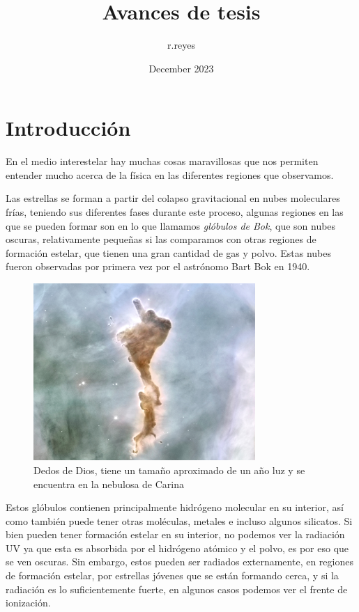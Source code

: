 \documentclass{book}
\title{Avances de tesis}
\author{r.reyes }
\date{December 2023}
\begin{document}
\maketitle

\tableofcontents

\newpage

\chapter{Introducción}

En el medio interestelar hay muchas cosas maravillosas que nos permiten entender mucho acerca de la física en las diferentes regiones que observamos.

Las estrellas se forman a partir del colapso gravitacional en nubes moleculares frías, teniendo sus diferentes fases durante este proceso, algunas regiones en las que se pueden formar son en lo que llamamos \textit{glóbulos de Bok}, que son nubes oscuras, relativamente pequeñas si las comparamos con otras regiones de formación estelar, que tienen una gran cantidad de gas y polvo. Estas nubes fueron observadas por primera vez por el astrónomo Bart Bok en 1940. 

\begin{figure}[h]
    \centering
    \includegraphics[width=0.75\textwidth]{Chp1_finger.jpg}
    \caption{Dedos de Dios, tiene un tamaño aproximado de un año luz y se encuentra en la nebulosa de Carina}
    \label{fig:zones}
\end{figure}

Estos glóbulos contienen principalmente hidrógeno molecular en su interior, así como también puede tener otras moléculas, metales e incluso algunos silicatos. Si bien pueden tener formación estelar en su interior, no podemos ver la radiación UV ya que esta es absorbida por el hidrógeno atómico y el polvo, es por eso que se ven oscuras. Sin embargo, estos pueden ser radiados externamente, en regiones de formación estelar, por estrellas jóvenes que se están formando cerca, y si la radiación es lo suficientemente fuerte, en algunos casos podemos ver el frente de ionización.
\end{document}
